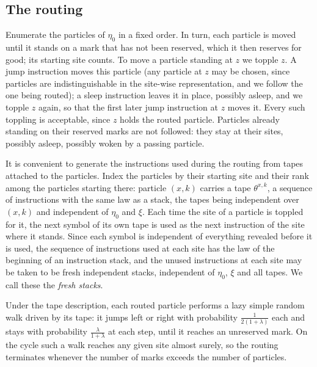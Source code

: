 \documentclass[11pt]{amsart}
\theoremstyle{remark}
\begin{document}
\subsection*{The routing}
Enumerate the particles of $\eta_0$ in a fixed order. In turn, each particle is moved until it stands on a mark that has
not been reserved, which it then reserves for good; its starting site counts. To move a particle standing at $z$ we
topple $z$. A jump instruction moves this particle (any particle at $z$ may be chosen, since particles are
indistinguishable in the site-wise representation, and we follow the one being routed); a sleep instruction leaves it in
place, possibly asleep, and we topple $z$ again, so that the first later jump instruction at $z$ moves it. Every such
toppling is acceptable, since $z$ holds the routed particle. Particles already
standing on their reserved marks are not followed: they stay at their sites, possibly asleep, possibly woken by a passing
particle.

It is convenient to generate the instructions used during the routing from tapes attached to the particles. Index the
particles by their starting site and their rank among the particles starting there: particle $(x,k)$ carries a tape
$\theta^{x,k}$, a sequence of instructions with the same law as a stack, the tapes being independent over $(x,k)$ and
independent of $\eta_0$ and $\xi$. Each time the site of a particle is toppled for it, the next symbol of its own tape is used as the next
instruction of the site where it stands. Since each symbol is independent of
everything revealed before it is used, the sequence of instructions used at each site has the law of the beginning of
an instruction stack, and the unused instructions at each site may be taken to be fresh independent stacks, independent of
$\eta_0$, $\xi$ and all tapes. We call these the \emph{fresh stacks}.

Under the tape description, each routed particle performs a lazy simple random walk driven by its tape: it jumps left or right
with probability $\frac{1}{2(1+\lambda)}$ each and stays with probability $\frac{\lambda}{1+\lambda}$ at each step, until
it reaches an unreserved mark. On the cycle such a walk reaches any given site almost surely, so the routing terminates
whenever the number of marks exceeds the number of particles.
\end{document}

